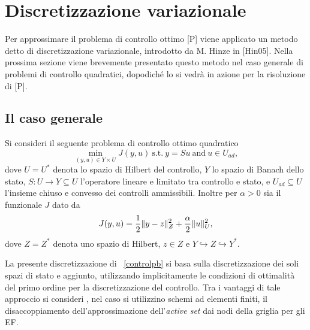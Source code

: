 \section{Discretizzazione variazionale}

Per approssimare il problema di controllo ottimo [P] viene applicato un metodo detto di discretizzazione variazionale, introdotto da M. Hinze in [Hin05]. Nella prossima sezione viene brevemente presentato questo metodo nel caso generale di problemi di controllo quadratici, dopodiché lo si vedrà in azione per  la risoluzione di [P].   


\subsection{Il caso generale}

Si consideri il seguente problema di controllo ottimo quadratico
\begin{equation}
\label{controlpb}
\min_{(y,u)\in Y\times U} J(y,u)   \ \text{s.t.} \ y=Su \  \text{and} \ u\in U_{ad},
\end{equation}
dove $ U=U^*$ denota lo spazio di Hilbert del controllo, $ Y $ lo spazio di Banach dello stato, $ S:U\to Y\subseteq U $ l'operatore lineare e limitato tra controllo e stato, e $ U_{ad}\subseteq U $ l'insieme chiuso e convesso dei controlli ammissibili. Inoltre per $ \alpha>0 $ sia il funzionale $ J $ dato da 
\begin{equation}
J(y,u)=\frac{1}{2}\lVert y-z\rVert^2_Z + \frac{\alpha}{2}\lVert u\rVert^2_U,
\end{equation}
dove $ Z=Z^* $ denota uno spazio di Hilbert, $ z\in Z $ e $ Y\hookrightarrow Z\hookrightarrow Y^* $.   

La presente  discretizzazione di ~\eqref{controlpb} si basa sulla discretizzazione dei soli spazi di stato e aggiunto, utilizzando implicitamente le condizioni di ottimalità del primo ordine per la discretizzazione del controllo. Tra i vantaggi di tale approccio si consideri , nel caso si utilizzino schemi ad elementi finiti,  il disaccoppiamento dell'approssimazione dell'\textit{active set} dai nodi della griglia per gli EF. 

